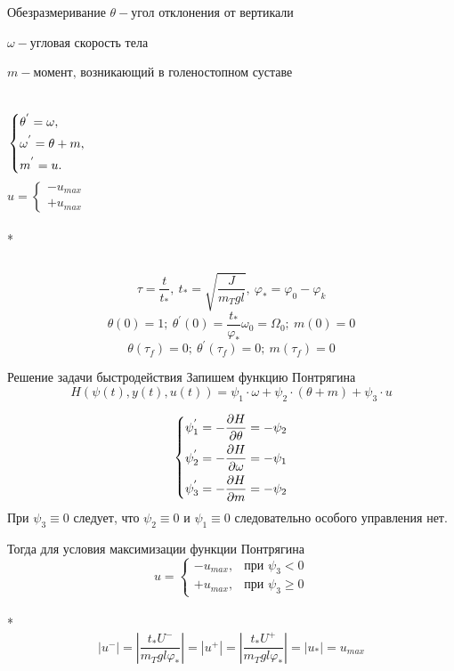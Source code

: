 \documentclass[10pt]{beamer}
\begin{document}
\begin{frame}{Обезразмеривание}
	$\theta - \text{угол отклонения от вертикали}$

	$\omega - \text{угловая скорость тела}$

	$m - \text{момент, возникающий в голеностопном суставе}$


	\begin{columns}
		\begin{equation}\label{basesystem}
			\left\{ {\begin{aligned}
						 & \theta^{'} = \omega , \hfill   \\
						 & \omega^{'} = \theta+m , \hfill \\
						 & m^{'} = u . \hfill             \\
					\end{aligned}} \right.
		\end{equation}
		\[
			u=
			\begin{cases}
				-u_{max} \\
				+u_{max}
			\end{cases}
		\]\\*
	\end{columns}

	\[
		\tau=\frac{t}{t_\ast},\ t_\ast=\sqrt{\frac{J}{m_Tgl}},\ \varphi_\ast=\varphi_0-\varphi_k
	\]
	\[
		\theta(0)=1;\ \theta^{'}(0)=\frac{t_\ast}{\varphi_\ast}\omega_0=\Omega_0;\ m(0)=0
	\]
	\[
		\theta(\tau_f)=0;\ \theta^{'}(\tau_f)=0;\ m(\tau_f)=0
	\]
\end{frame}
\begin{frame}[shrink=1]{Решение задачи быстродействия}
	Запишем функцию Понтрягина
	\[
		H(\psi(t),y(t),u(t))=\psi_1\cdot\omega+\psi_2\cdot(\theta+m)+\psi_3\cdot u
	\]

	\begin{equation} \label{7}
		\left\{ {\begin{aligned}
					 & \psi^{'}_1=  - \frac{{\partial H}}{{\partial \theta}} = - \psi_2\hfill  \\
					 & \psi^{'}_2=  - \frac{{\partial H}}{{\partial \omega }} = - \psi_1\hfill \\
					 & \psi^{'}_3=  - \frac{{\partial H}}{{\partial m }} = - \psi_2 \hfill     \\
				\end{aligned}} \right.
	\end{equation}
	При $\psi_3\equiv0$ следует, что $\psi_2\equiv0$ и $\psi_1\equiv0$ следовательно особого управления нет.

	Тогда для условия максимизации функции Понтрягина
	\[
		u=
		\begin{cases}
			-u_{max}, & \text{при $\psi_3<0$}          \\
			+u_{max}, & \text{при $\psi_3\geqslant 0$}
		\end{cases}
	\]\\*
	\[
    |u^-|=|\frac{t_\ast U^-}{m_Tgl\varphi_\ast }|=|u^+|=|\frac{t_\ast U^+}{m_Tgl\varphi_\ast}|=|u_\ast|=u_{max}
\]
\end{frame}
\end{document}

